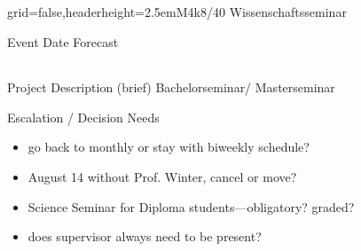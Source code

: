\documentclass[english]{kiesgrube}
\begin{document}
\begin{poster}{grid=false,headerheight=2.5em}{}{M4k8/40 Wissenschaftsseminar}{}{}
\begin{posterbox}[name=event,below=progress,span=2]{Event Date Forecast}
\begin{tabulary}{\textwidth}{lllllL}
\end{tabulary}
\end{posterbox}
\begin{posterbox}[name=description,column=1,row=0]{Project Description (brief)}
Bachelorseminar/ Masterseminar
\end{posterbox}
\begin{posterbox}[name=escalation,column=1,below=description]{Escalation / Decision Needs}
\begin{itemize}
\item go back to monthly or stay with biweekly schedule?
\item August 14 without Prof. Winter, cancel or move?
\item Science Seminar for Diploma students---obligatory? graded?
\item does supervisor always need to be present?
\end{itemize}
\end{posterbox}
\footer{}
\end{poster}

\newpage
\end{document}

